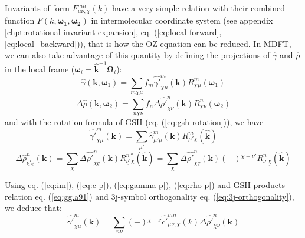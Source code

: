 Invariants of form $F_{\mu\nu,\chi}^{mn}(k)$ have a very simple relation
with their combined function $F(k,\boldsymbol{\omega_{1}},\boldsymbol{\omega_{2}})$
in intermolecular coordinate system (see appendix \ref{chpt:rotational-invariant-expansion},
eq. (\ref{eq:local-forward}, \ref{eq:local_backward})), that is
how the \acs{OZ} equation can be reduced. In \acs{MDFT}, we can
also take advantage of this quantity by defining the projections of
$\hat{\gamma}$ and $\hat{\rho}$ in the local frame ($\boldsymbol{\omega}_{i}=\hat{\mathbf{k}}^{-1}\mathbf{\Omega}_{i}$):
\begin{equation}
\hat{\gamma}(\mathbf{k},\boldsymbol{\omega}_{1})=\sum_{m\chi\mu}f_{m}\hat{\gamma'}_{\chi\mu}^{m}(\mathbf{k})R_{\chi\mu}^{m}(\boldsymbol{\omega}_{1})\label{eq:gamma-projection-local}
\end{equation}
\begin{equation}
\Delta\hat{\rho}(\mathbf{k},\boldsymbol{\omega}_{2})=\sum_{n\chi\nu}f_{n}\Delta\hat{\rho'}_{\chi\nu}^{n}(\mathbf{k})R_{\chi\nu}^{n}(\mathbf{\boldsymbol{\omega}}_{2})\label{eq:delta-rho-projection-local}
\end{equation}
and with the rotation formula of \acs{GSH} (eq. (\ref{eq:gsh-rotation})),
we have 
\begin{equation}
\hat{\gamma'}_{\chi\mu}^{m}(\mathbf{k})=\sum_{\mu'}\hat{\gamma}_{\mu'\mu}^{m}(\mathbf{k})R_{\mu'\chi}^{m}(\hat{\mathbf{k}})\label{eq:gamma-p}
\end{equation}
\begin{equation}
\Delta\hat{\rho}_{\underline{\nu'}\underline{\nu}}^{n}(\mathbf{k})=\sum_{\chi}\Delta\hat{\rho'}_{\chi\underline{\nu}}^{n}(\mathbf{k})R_{\underline{\nu'}\chi}^{n*}(\hat{\mathbf{k}})=\sum_{\chi}\Delta\hat{\rho'}_{\chi\underline{\nu}}^{n}(\mathbf{k})\left(-\right){}^{\chi+\nu'}R_{\nu'\underline{\chi}}^{n}(\hat{\mathbf{k}})\label{eq:rho-p}
\end{equation}

Using eq. (\ref{eq:im}), (\ref{eq:c-p}), (\ref{eq:gamma-p}), (\ref{eq:rho-p})
and \acs{GSH} products relation eq. (\ref{eq:gg.a91}) and 3j-symbol
orthogonality eq. (\ref{eq:3j-orthogonality}), we deduce that:
\begin{equation}
\hat{\gamma'}_{\chi\mu}^{m}(\mathbf{k})=\sum_{n\nu}\left(-\right){}^{\chi+\nu}\hat{c'}_{\mu\nu,\chi}^{mn}(k)\Delta\hat{\rho'}_{\chi\underline{\nu}}^{n}(\mathbf{k})\label{eq:gamma-blum}
\end{equation}

